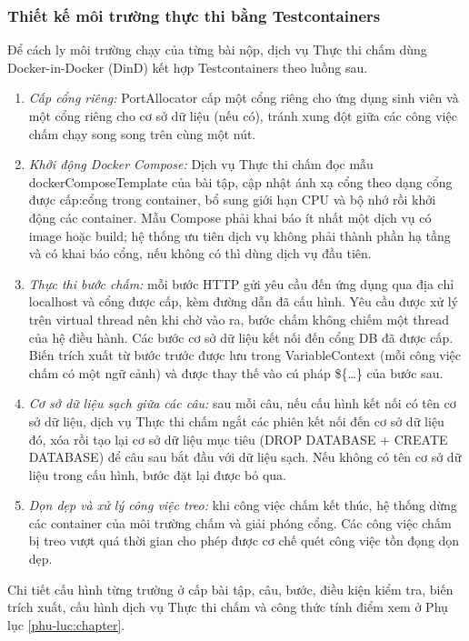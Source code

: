 \documentclass[../BTL.tex]{subfiles}
\begin{document}
\subsubsection{Thiết kế môi trường thực thi bằng Testcontainers}

Để cách ly môi trường chạy của từng bài nộp, dịch vụ Thực thi chấm dùng Docker-in-Docker (DinD) kết hợp Testcontainers theo luồng sau.

\begin{enumerate}
\item \emph{Cấp cổng riêng:} \textnormal{PortAllocator} cấp một cổng riêng cho ứng dụng sinh viên và một cổng riêng cho cơ sở dữ liệu (nếu có), tránh xung đột giữa các công việc chấm chạy song song trên cùng một nút.
\item \emph{Khởi động Docker Compose:} Dịch vụ Thực thi chấm đọc mẫu \textnormal{dockerComposeTemplate} của bài tập, cập nhật ánh xạ cổng theo dạng \textnormal{cổng được cấp:cổng trong container}, bổ sung giới hạn CPU và bộ nhớ rồi khởi động các container. Mẫu Compose phải khai báo ít nhất một dịch vụ có \textnormal{image} hoặc \textnormal{build}; hệ thống ưu tiên dịch vụ không phải thành phần hạ tầng và có khai báo cổng, nếu không có thì dùng dịch vụ đầu tiên.
\item \emph{Thực thi bước chấm:} mỗi bước HTTP gửi yêu cầu đến ứng dụng qua địa chỉ localhost và cổng được cấp, kèm đường dẫn đã cấu hình. Yêu cầu được xử lý trên virtual thread nên khi chờ vào ra, bước chấm không chiếm một thread của hệ điều hành. Các bước cơ sở dữ liệu kết nối đến cổng DB đã được cấp. Biến trích xuất từ bước trước được lưu trong \textnormal{VariableContext} (mỗi công việc chấm có một ngữ cảnh) và được thay thế vào cú pháp \textnormal{\$\{\ldots\}} của bước sau.
\item \emph{Cơ sở dữ liệu sạch giữa các câu:} sau mỗi câu, nếu cấu hình kết nối có tên cơ sở dữ liệu, dịch vụ Thực thi chấm ngắt các phiên kết nối đến cơ sở dữ liệu đó, xóa rồi tạo lại cơ sở dữ liệu mục tiêu (\textnormal{DROP DATABASE} + \textnormal{CREATE DATABASE}) để câu sau bắt đầu với dữ liệu sạch. Nếu không có tên cơ sở dữ liệu trong cấu hình, bước đặt lại được bỏ qua.
\item \emph{Dọn dẹp và xử lý công việc treo:} khi công việc chấm kết thúc, hệ thống dừng các container của môi trường chấm và giải phóng cổng. Các công việc chấm bị treo vượt quá thời gian cho phép được cơ chế quét công việc tồn đọng dọn dẹp.
\end{enumerate}


Chi tiết cấu hình từng trường ở cấp bài tập, câu, bước, điều kiện kiểm tra, biến trích xuất, cấu hình dịch vụ Thực thi chấm và công thức tính điểm xem ở Phụ lục \ref{phu-luc:chapter}.
\end{document}
